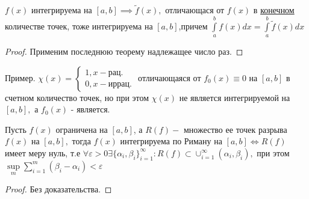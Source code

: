 \documentclass[../main.tex]{subfiles}
\begin{document}
\begin{corollary}
    $f(x)$ интегрируема на $[a,b]\implies \tilde{f}(x),$ отличающася от $f(x)$ в \underline{конечном} количестве точек, тоже интегрируема на $[a,b]$,причем $\int\limits_{a}^{b}f(x)dx=\int\limits_{a}^{b}\tilde{f}(x)dx$
\end{corollary}
\begin{proof}
    Применим последнюю теорему надлежащее число раз.
\end{proof}
\noindent   Пример. $\chi(x)=\begin{cases}
    1,x-\text{рац.}\\ 
    0,x-\text{иррац.}
\end{cases}$ отличающаяся от $f_{0}(x)\equiv 0$ на $[a,b]$ в счетном количество точек, но при этом $\chi(x) $ не является интегрируемой на $[a,b],$ а $f_{0}(x)$ - является.
\begin{theorem} 
    Пусть $f(x)$ ограничена на $[a,b]$, а $R(f)-$ множество ее точек разрыва $f(x)$ на $[a,b],$ тогда $f(x)$ интегрируема по Риману на $[a,b] \Leftrightarrow R(f)$ имеет меру нуль, т.е $\forall \varepsilon>0 \exists \{\alpha_{i},\beta_{i}\}_{i=1}^{\infty}:R(f)\subset \cup_{i=1}^{\infty}(\alpha_{i},\beta_{i}),$ при этом $\underset{m}{\sup } \sum_{i=1}^{m}(\beta_{i}-\alpha_{i})<\varepsilon$
\end{theorem}
\begin{proof}
    Без доказательства.
\end{proof}
\end{document}
